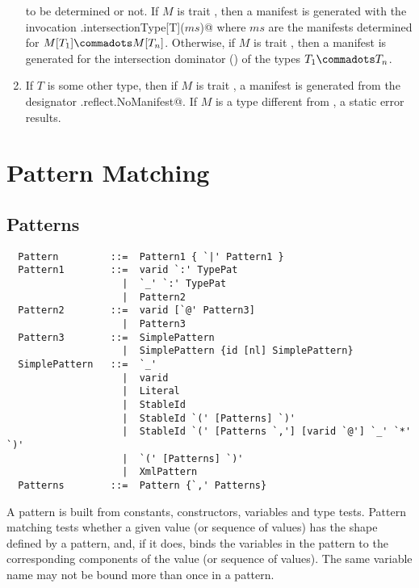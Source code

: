 \begin{enumerate}
to be determined or not. 
If $M$ is trait \lstinline@Manifest@, then
a manifest is generated with the invocation
\lstinline@Manifest.intersectionType[T]($ms$)@ where $ms$ are the manifests
determined for $M[T_1] \commadots M[T_n]$.
Otherwise, if $M$ is trait \lstinline@ClassManifest@, 
then a manifest is generated for the intersection dominator
()
of the types $T_1 \commadots T_n$.
\item
If $T$ is some other type, then if $M$ is trait \lstinline@OptManifest@, 
a manifest is generated from the designator \lstinline@scala.reflect.NoManifest@.
If $M$ is a type different from \lstinline@OptManifest@, a static error results.
\end{enumerate}

\chapter{Pattern Matching}

\section{Patterns}

\label{sec:patterns}

\syntax\begin{lstlisting}
  Pattern         ::=  Pattern1 { `|' Pattern1 }
  Pattern1        ::=  varid `:' TypePat
                    |  `_' `:' TypePat
                    |  Pattern2
  Pattern2        ::=  varid [`@' Pattern3]
                    |  Pattern3
  Pattern3        ::=  SimplePattern 
                    |  SimplePattern {id [nl] SimplePattern}
  SimplePattern   ::=  `_'
                    |  varid
                    |  Literal
                    |  StableId
                    |  StableId `(' [Patterns] `)'
                    |  StableId `(' [Patterns `,'] [varid `@'] `_' `*' `)'
                    |  `(' [Patterns] `)'
                    |  XmlPattern
  Patterns        ::=  Pattern {`,' Patterns}
\end{lstlisting}


A pattern is built from constants, constructors, variables and type
tests. Pattern matching tests whether a given value (or sequence of values)
has the shape defined by a pattern, and, if it does, binds the
variables in the pattern to the corresponding components of the value
(or sequence of values).  The same variable name may not be bound more
than once in a pattern.

